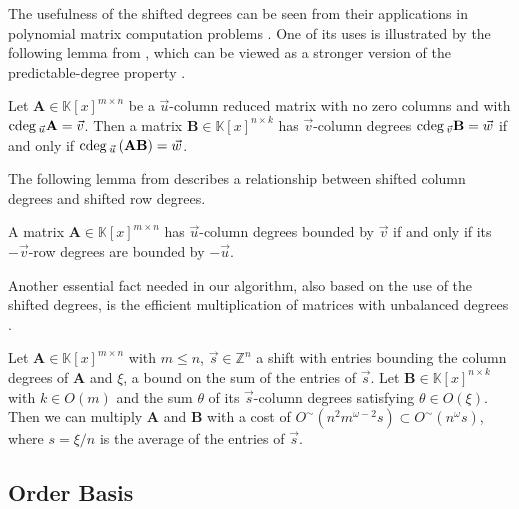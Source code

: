 The usefulness of the shifted degrees can be seen from their applications
in polynomial matrix computation problems \cite{ZL2012,za2012}. One
of its uses is illustrated by the following lemma from \cite[Chapter 2]{zhou:phd2012},
which can be viewed as a stronger version of the predictable-degree
property \cite{kailath:1980}. 
\begin{lem}
\label{lem:predictableDegree}Let $\mathbf{A}\in\mathbb{K}\left[x\right]^{m\times n}$
be a $\vec{u}$-column reduced matrix with no zero columns and with
${\rm cdeg}\,_{\vec{u}}\mathbf{A}=\vec{v}$. Then a matrix $\mathbf{B}\in\mathbb{K}\left[x\right]^{n\times k}$
has $\vec{v}$-column degrees ${\rm cdeg}\,_{\vec{v}}\mathbf{B}=\vec{w}$
if and only if ${\rm cdeg}\,_{\vec{u}}\left(\mathbf{A}\mathbf{B}\right)=\vec{w}$. 
\end{lem}
The following lemma from \cite[Chapter 2]{zhou:phd2012} describes
a relationship between shifted column degrees and shifted row degrees.
\begin{lem}
\label{lem:columnDegreesRowDegreesSymmetry}A matrix $\mathbf{A}\in\mathbb{K}\left[x\right]^{m\times n}$
has $\vec{u}$-column degrees bounded by $\vec{v}$ if and only if
its $-\vec{v}$-row degrees are bounded by $-\vec{u}$. 
\end{lem}
Another essential fact needed in our algorithm, also based on the
use of the shifted degrees, is the efficient multiplication of matrices
with unbalanced degrees \cite[Theorem 3.7]{za2012}. 
\begin{thm}
\label{thm:multiplyUnbalancedMatrices} Let $\mathbf{A}\in\mathbb{K}\left[x\right]^{m\times n}$
with $m\le n$, $\vec{s}\in\mathbb{Z}^{n}$ a shift with entries bounding
the column degrees of $\mathbf{A}$ and $\xi$, a bound on the sum
of the entries of $\vec{s}$. Let $\mathbf{B}\in\mathbb{K}\left[x\right]^{n\times k}$
with $k\in O\left(m\right)$ and the sum $\theta$ of its $\vec{s}$-column
degrees satisfying $\theta\in O\left(\xi\right)$. Then we can multiply
$\mathbf{A}$ and $\mathbf{B}$ with a cost of $O^{\sim}(n^{2}m^{\omega-2}s)\subset O^{\sim}(n^{\omega}s)$,
where $s=\xi/n$ is the average of the entries of $\vec{s}$. 
\end{thm}

\subsection{Order Basis}

